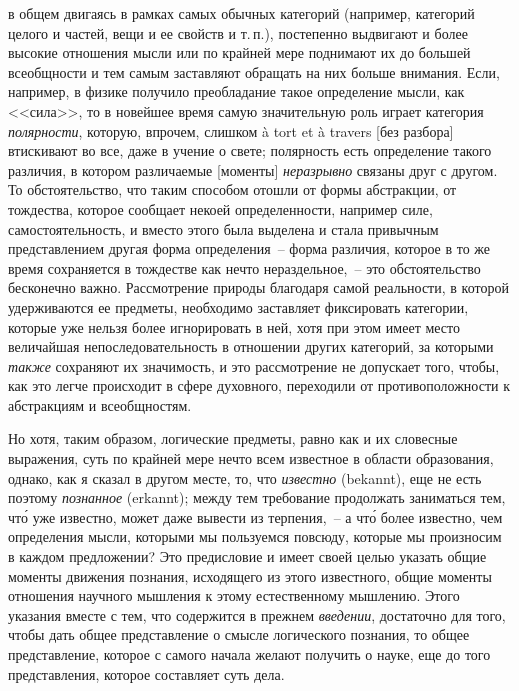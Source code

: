 в общем двигаясь в рамках самых обычных категорий
(например, категорий целого и частей, вещи и ее свойств
и т.\,п.), постепенно выдвигают и более высокие отношения
мысли или по крайней мере поднимают их до большей
всеобщности и тем самым заставляют обращать на
них больше внимания. Если, например, в физике получило
преобладание такое определение мысли, как <<сила>>, то
в новейшее время самую значительную роль играет категория
\emph{полярности}\endnotemark{}, которую, впрочем, слишком à tort et à
travers [без разбора] втискивают во все, даже в учение
о свете; полярность есть определение такого различия, в
котором различаемые [моменты] \emph{неразрывно} связаны
друг с другом. То обстоятельство, что таким способом
отошли от формы абстракции, от тождества, которое
сообщает некоей определенности, например силе, самостоятельность,
и вместо этого была выделена и стала привычным
представлением другая форма определения~--
форма различия, которое в то же время сохраняется в
тождестве как нечто нераздельное,~-- это обстоятельство
бесконечно важно. Рассмотрение природы благодаря самой
реальности, в которой удерживаются ее предметы,
необходимо заставляет фиксировать категории, которые
уже нельзя более игнорировать в ней, хотя при этом имеет
место величайшая непоследовательность в отношении
других категорий, за которыми \emph{также} сохраняют их значимость,
и это рассмотрение не допускает того, чтобы,
как это легче происходит в сфере духовного, переходили
от противоположности к абстракциям и всеобщностям.


Но хотя, таким образом, логические предметы, равно
как и их словесные выражения, суть по крайней мере
нечто всем известное в области образования, однако, как
я сказал в другом месте\endnotemark{}, то, что \emph{известно} (bekannt),
еще не есть поэтому \emph{познанное} (erkannt); между тем
требование продолжать заниматься тем, чт\'о уже известно,
может даже вывести из терпения,~-- а чт\'о более известно,
чем определения мысли, которыми мы пользуемся
повсюду, которые мы произносим в каждом предложении?
Это предисловие и имеет своей целью указать общие
моменты движения познания, исходящего из этого известного,
общие моменты отношения научного мышления
к этому естественному мышлению. Этого указания вместе
с тем, что содержится в прежнем \emph{введении}, достаточно
для того, чтобы дать общее представление о смысле логического
познания, то общее представление, которое с самого
начала желают получить о науке, еще до того представления,
которое составляет суть дела.

